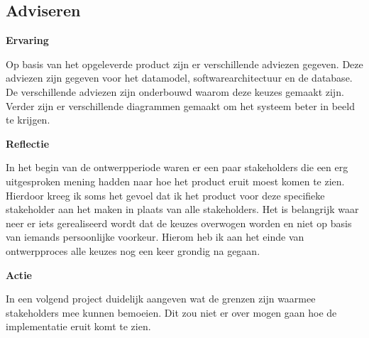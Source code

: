 \subsection{Adviseren}

\textbf{Ervaring}

\whitespace
Op basis van het opgeleverde product zijn er verschillende adviezen gegeven.
Deze adviezen zijn gegeven voor het datamodel, softwarearchitectuur en de database.
De verschillende adviezen zijn onderbouwd waarom deze keuzes gemaakt zijn.
Verder zijn er verschillende diagrammen gemaakt om het systeem beter in beeld te krijgen.

\whitespace
\textbf{Reflectie}

\whitespace
In het begin van de ontwerpperiode waren er een paar stakeholders die een erg uitgesproken mening hadden naar hoe het product eruit moest komen te zien.
Hierdoor kreeg ik soms het gevoel dat ik het product voor deze specifieke stakeholder aan het maken in plaats van alle stakeholders.
Het is belangrijk waar neer er iets gerealiseerd wordt dat de keuzes overwogen worden en niet op basis van iemands persoonlijke voorkeur.
Hierom heb ik aan het einde van ontwerpproces alle keuzes nog een keer grondig na gegaan.

\whitespace
\textbf{Actie}

\whitespace
In een volgend project duidelijk aangeven wat de grenzen zijn waarmee stakeholders mee kunnen bemoeien.
Dit zou niet er over mogen gaan hoe de implementatie eruit komt te zien.

